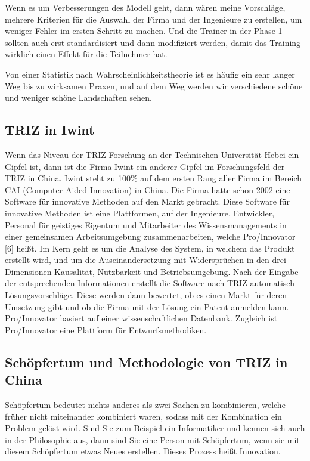 \documentclass[11pt,a4paper]{article}
\begin{document}
Wenn es um Verbesserungen des Modell geht, dann wären meine Vorschläge,
mehrere Kriterien für die Auswahl der Firma und der Ingenieure zu erstellen,
um weniger Fehler im ersten Schritt zu machen. Und die Trainer in der Phase 1
sollten auch erst standardisiert und dann modifiziert werden, damit das
Training wirklich einen Effekt für die Teilnehmer hat.

Von einer Statistik nach Wahrscheinlichkeitstheorie ist es häufig ein sehr
langer Weg bis zu wirksamen Praxen, und auf dem Weg werden wir verschiedene
schöne und weniger schöne Landschaften sehen.

\subsection{TRIZ in Iwint}
Wenn das Niveau der TRIZ-Forschung an der Technischen Universität Hebei ein
Gipfel ist, dann ist die Firma Iwint ein anderer Gipfel im Forschungsfeld der
TRIZ in China. Iwint steht zu 100\% auf dem ersten Rang aller Firma im Bereich
CAI (Computer Aided Innovation) in China.  Die Firma hatte schon 2002 eine
Software für innovative Methoden auf den Markt gebracht. Diese Software für
innovative Methoden ist eine Plattformen, auf der Ingenieure, Entwickler,
Personal für geistiges Eigentum und Mitarbeiter des Wissensmanagements in
einer gemeinsamen Arbeitsumgebung zusammenarbeiten, welche Pro/Innovator [6]
heißt.  Im Kern geht es um die Analyse des System, in welchem das Produkt
erstellt wird, und um die Auseinandersetzung mit Widersprüchen in den drei
Dimensionen Kausalität, Nutzbarkeit und Betriebsumgebung.  Nach der Eingabe
der entsprechenden Informationen erstellt die Software nach TRIZ automatisch
Lösungsvorschläge. Diese werden dann bewertet, ob es einen Markt für deren
Umsetzung gibt und ob die Firma mit der Lösung ein Patent anmelden kann.
Pro/Innovator basiert auf einer wissenschaftlichen Datenbank. Zugleich ist
Pro/Innovator eine Plattform für Entwurfsmethodiken.

\subsection{Schöpfertum und Methodologie von TRIZ in China}
Schöpfertum bedeutet nichts anderes als zwei Sachen zu kombinieren, welche
früher nicht miteinander kombiniert waren, sodass mit der Kombination ein
Problem gelöst wird. Sind Sie zum Beispiel ein Informatiker und kennen sich
auch in der Philosophie aus, dann sind Sie eine Person mit Schöpfertum, wenn
sie mit diesem Schöpfertum etwas Neues erstellen. Dieses Prozess heißt
Innovation.
\end{document}
